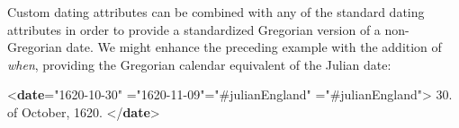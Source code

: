 Custom dating attributes can be combined with any of the standard dating attributes in order to provide a standardized Gregorian version of a non-Gregorian date. We might enhance the preceding example with the addition of {\itshape when}, providing the Gregorian calendar equivalent of the Julian date: \par\bgroup{}\exampleFont \begin{shaded}\noindent\mbox{}{<\textbf{date}\hspace*{1em}{when-custom}="{1620-10-30}"\mbox{}\newline 
\hspace*{1em}{when}="{1620-11-09}"\hspace*{1em}{datingMethod}="{\#julianEngland}"\mbox{}\newline 
\hspace*{1em}{calendar}="{\#julianEngland}">} 30. of\mbox{}\newline 
 October, 1620. {</\textbf{date}>}\end{shaded}\egroup\par 
